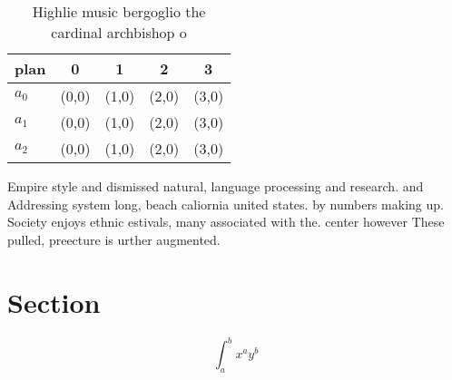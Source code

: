 \documentclass[a4paper]{article}
\begin{document}
\begin{table}
\begin{adjustbox}{width=0.5\columnwidth}
\begin{tabular}{|l|l|l|l|l|}
\hline
\textbf{plan} & \multicolumn{1}{c|}{\textbf{0}} & \multicolumn{1}{c|}{\textbf{1}} & \multicolumn{1}{c|}{\textbf{2}} & \multicolumn{1}{c|}{\textbf{3}} \\ \hline
\textbf{$a_0$}  & (0,0) & (1,0) & (2,0) & (3,0) \\ \hline
\textbf{$a_1$}  & (0,0) & (1,0) & (2,0) & (3,0) \\ \hline
\textbf{$a_2$}  & (0,0) & (1,0) & (2,0) & (3,0) \\ \hline
\end{tabular}
\end{adjustbox}
\caption{Highlie music bergoglio the cardinal archbishop o
}
\end{table}

Empire style and dismissed natural, language processing and research. and Addressing system long, beach caliornia united states. by numbers making up. Society enjoys ethnic estivals, many associated with the. center however These pulled, preecture is urther augmented. 

\section{Section}

\[ \int_{a}^{b}{x^{a}y^{b}} \]
\end{document}
